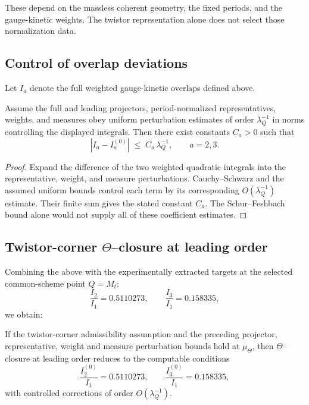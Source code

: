 \documentclass[11pt]{article}
\begin{document}
These depend on the massless coherent geometry, the fixed periods, and the
gauge-kinetic weights. The twistor representation alone does not select those
normalization data.

\subsection{Control of overlap deviations}

Let $I_a$ denote the full weighted gauge-kinetic overlaps defined above.

\begin{lemma}
Assume the full and leading projectors, period-normalized representatives,
weights, and measures obey uniform perturbation estimates of order
$\lambda_Q^{-1}$ in norms controlling the displayed integrals. Then there
exist constants $C_a>0$ such that
\[
|I_a - I_a^{(0)}| \;\le\; C_a\,\lambda_Q^{-1},
\qquad a=2,3.
\]
\end{lemma}

\begin{proof}
Expand the difference of the two weighted quadratic integrals into the
representative, weight, and measure perturbations. Cauchy--Schwarz and the
assumed uniform bounds control each term by its corresponding
$O(\lambda_Q^{-1})$ estimate. Their finite sum gives the stated constant
$C_a$. The Schur--Feshbach bound alone would not supply all of these
coefficient estimates.
\end{proof}

\subsection{Twistor-corner \texorpdfstring{$\Theta$}{Theta}--closure at leading order}

Combining the above with the experimentally extracted targets at the selected common-scheme point $Q=M_t$:
\[
\frac{I_2}{I_1} = 0.5110273,
\qquad
\frac{I_3}{I_1} = 0.158335,
\]
we obtain:

\begin{theorem}
If the twistor-corner admissibility assumption and the preceding projector,
representative, weight and measure perturbation bounds hold at $\mu_\Theta$, then
$\Theta$--closure at leading order reduces to the computable conditions
\[
\frac{I_2^{(0)}}{I_1} = 0.5110273,
\qquad
\frac{I_3^{(0)}}{I_1} = 0.158335,
\]
with controlled corrections of order $O(\lambda_Q^{-1})$.
\end{theorem}
\end{document}

